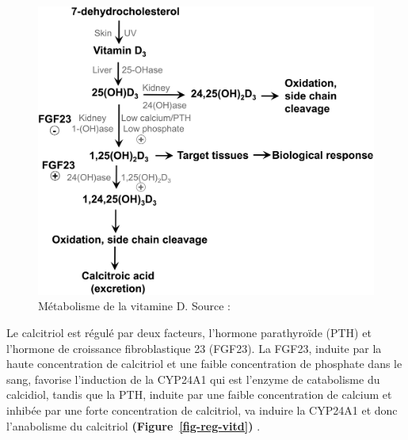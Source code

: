 \documentclass[
  letterpaper,
  DIV=11,
  numbers=noendperiod]{scrartcl}
\begin{document}
\begin{figure}

{\centering \includegraphics{figures/vitamin-d-metabolism.png}

}

\caption{\label{fig-metabolism-vitd}Métabolisme de la vitamine D. Source
: \textcite{Norman.2008}}

\end{figure}

Le calcitriol est régulé par deux facteurs, l'hormone parathyroïde (PTH)
et l'hormone de croissance fibroblastique 23 (FGF23). La FGF23, induite
par la haute concentration de calcitriol et une faible concentration de
phosphate dans le sang, favorise l'induction de la CYP24A1 qui est
l'enzyme de catabolisme du calcidiol, tandis que la PTH, induite par une
faible concentration de calcium et inhibée par une forte concentration
de calcitriol, va induire la CYP24A1 et donc l'anabolisme du calcitriol
\textbf{(Figure~\ref{fig-reg-vitd})}
\autocite{Dankers.2017,Christakos.2010}.
\end{document}
